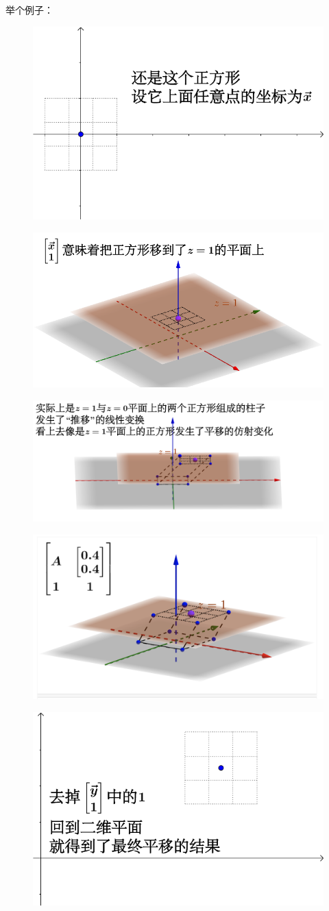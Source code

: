 \documentclass[12pt]{article}
\begin{document}
举个例子：
\begin{figure}[H]
    \centering
    \includegraphics[width=.5\textwidth]{fig/UnderstandAffineTransformation_1.png}
\end{figure}
\begin{figure}[H]
    \centering
    \includegraphics[width=.5\textwidth]{fig/UnderstandAffineTransformation_2.png}
\end{figure}
\begin{figure}[H]
    \centering
    \includegraphics[width=.5\textwidth]{fig/UnderstandAffineTransformation_3.png}
\end{figure}
\begin{figure}[H]
    \centering
    \includegraphics[width=.5\textwidth]{fig/UnderstandAffineTransformation_4.png}
\end{figure}
\begin{figure}[H]
    \centering
    \includegraphics[width=.5\textwidth]{fig/UnderstandAffineTransformation_5.png}
\end{figure}
\end{document}
